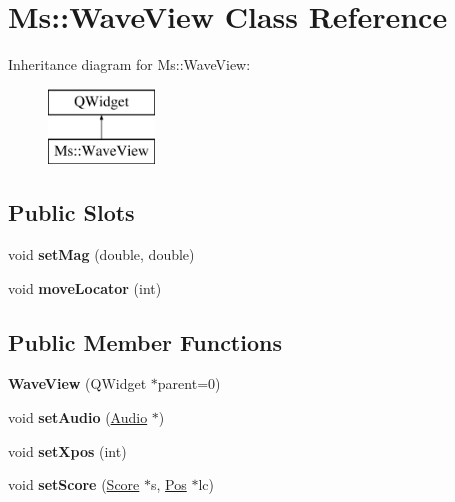 \hypertarget{class_ms_1_1_wave_view}{}\section{Ms\+:\+:Wave\+View Class Reference}
\label{class_ms_1_1_wave_view}
Inheritance diagram for Ms\+:\+:Wave\+View\+:\begin{figure}[H]
\begin{center}
\leavevmode
\includegraphics[height=2.000000cm]{class_ms_1_1_wave_view}
\end{center}
\end{figure}
\subsection*{Public Slots}
\begin{DoxyCompactItemize}
\item 
\mbox{\label{class_ms_1_1_wave_view_ae5f250c2669ae405e46f65eae69eafae}} 
void {\bfseries set\+Mag} (double, double)
\item 
\mbox{\label{class_ms_1_1_wave_view_ad2c2d01613d0ebec26b2ebf85d6ede0b}} 
void {\bfseries move\+Locator} (int)
\end{DoxyCompactItemize}
\subsection*{Public Member Functions}
\begin{DoxyCompactItemize}
\item 
\mbox{\label{class_ms_1_1_wave_view_af188713fc6401926a4022c1695e0f476}} 
{\bfseries Wave\+View} (Q\+Widget $\ast$parent=0)
\item 
\mbox{\label{class_ms_1_1_wave_view_a208d98caa7a2f7d4c4d0d91012db6985}} 
void {\bfseries set\+Audio} (\hyperlink{class_ms_1_1_audio}{Audio} $\ast$)
\item 
\mbox{\label{class_ms_1_1_wave_view_ab0a2c733d364f66744e0786d02fa6628}} 
void {\bfseries set\+Xpos} (int)
\item 
\mbox{\label{class_ms_1_1_wave_view_ac2fa57e5e1bf68bcd13fbfc4a1835364}} 
void {\bfseries set\+Score} (\hyperlink{class_ms_1_1_score}{Score} $\ast$s, \hyperlink{class_ms_1_1_pos}{Pos} $\ast$lc)
\end{DoxyCompactItemize}


